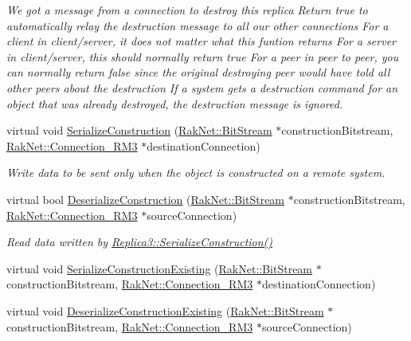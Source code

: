 \begin{DoxyCompactItemize}
\begin{DoxyCompactList}\small\item\em We got a message from a connection to destroy this replica Return true to automatically relay the destruction message to all our other connections For a client in client/server, it does not matter what this funtion returns For a server in client/server, this should normally return true For a peer in peer to peer, you can normally return false since the original destroying peer would have told all other peers about the destruction If a system gets a destruction command for an object that was already destroyed, the destruction message is ignored. \end{DoxyCompactList}\item 
virtual void \hyperlink{class_rak_net_1_1_replica3_composite_a75be39067450e1d717473408600a9c73}{Serialize\-Construction} (\hyperlink{class_rak_net_1_1_bit_stream}{Rak\-Net\-::\-Bit\-Stream} $\ast$construction\-Bitstream, \hyperlink{class_rak_net_1_1_connection___r_m3}{Rak\-Net\-::\-Connection\-\_\-\-R\-M3} $\ast$destination\-Connection)
\begin{DoxyCompactList}\small\item\em Write data to be sent only when the object is constructed on a remote system. \end{DoxyCompactList}\item 
virtual bool \hyperlink{class_rak_net_1_1_replica3_composite_a387379441c90fcb6381d0227c42c5712}{Deserialize\-Construction} (\hyperlink{class_rak_net_1_1_bit_stream}{Rak\-Net\-::\-Bit\-Stream} $\ast$construction\-Bitstream, \hyperlink{class_rak_net_1_1_connection___r_m3}{Rak\-Net\-::\-Connection\-\_\-\-R\-M3} $\ast$source\-Connection)
\begin{DoxyCompactList}\small\item\em Read data written by \hyperlink{class_rak_net_1_1_replica3_a8297aa828aa9261d8ff6194f0023423a}{Replica3\-::\-Serialize\-Construction()} \end{DoxyCompactList}\item 
virtual void \hyperlink{class_rak_net_1_1_replica3_composite_a1b73936583a501800162571c5c117aff}{Serialize\-Construction\-Existing} (\hyperlink{class_rak_net_1_1_bit_stream}{Rak\-Net\-::\-Bit\-Stream} $\ast$construction\-Bitstream, \hyperlink{class_rak_net_1_1_connection___r_m3}{Rak\-Net\-::\-Connection\-\_\-\-R\-M3} $\ast$destination\-Connection)
\item 
virtual void \hyperlink{class_rak_net_1_1_replica3_composite_a90b834da8ba20e7e46dd2efedfc83f78}{Deserialize\-Construction\-Existing} (\hyperlink{class_rak_net_1_1_bit_stream}{Rak\-Net\-::\-Bit\-Stream} $\ast$construction\-Bitstream, \hyperlink{class_rak_net_1_1_connection___r_m3}{Rak\-Net\-::\-Connection\-\_\-\-R\-M3} $\ast$source\-Connection)

\end{DoxyCompactItemize}
